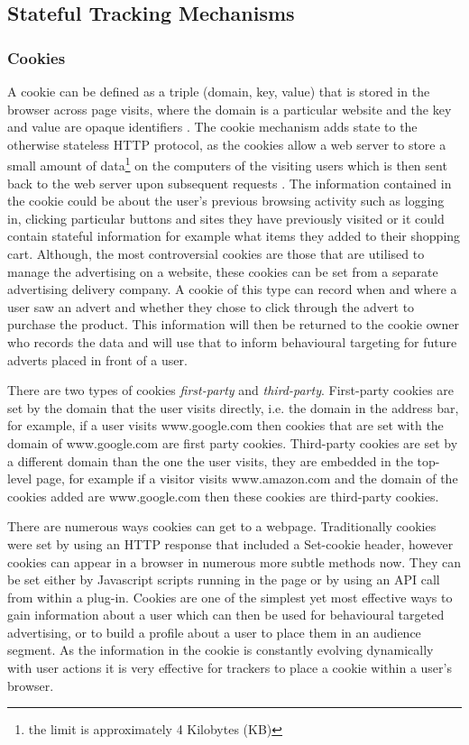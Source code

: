\documentclass[12pt]{article}
\begin{document}
\subsection{Stateful Tracking Mechanisms}

\subsubsection {Cookies} \label{cookies}
A cookie can be defined as a triple (domain, key, value) that is stored in the browser across page visits, where the domain is a particular website and the key and value are opaque identifiers \parencite{roesner}. The cookie mechanism adds state to the otherwise stateless HTTP protocol, as the cookies allow a web server to store a small amount of data\footnote{the limit is approximately 4 Kilobytes (KB)} on the computers of the visiting users which is then sent back to the web server upon subsequent requests \parencite{cookielessMonster}. The information contained in the cookie could be about the user's previous browsing activity such as logging in, clicking particular buttons and sites they have previously visited or it could contain stateful information for example what items they added to their shopping cart. Although, the most controversial cookies are those that are utilised to manage the advertising on a website, these cookies can be set from a separate advertising delivery company. A cookie of this type can record when and where a user saw an advert and whether they chose to click through the advert to purchase the product. This information will then be returned to the cookie owner who records the data and will use that to inform behavioural targeting for future adverts placed in front of a user.  \newline 

There are two types of cookies \textit{first-party} and \textit{third-party}. First-party cookies are set by the domain that the user visits directly, i.e. the domain in the address bar, for example, if a user visits www.google.com then cookies that are set with the domain of www.google.com are first party cookies. Third-party cookies are set by a different domain than the one the user visits, they are embedded in the top-level page, for example if a visitor visits www.amazon.com and the domain of the cookies added are www.google.com then these cookies are third-party cookies. \newline

There are numerous ways cookies can get to a webpage. Traditionally cookies were set by using an HTTP response that included a Set-cookie header, however cookies can appear in a browser in numerous more subtle methods now. They can be set either by Javascript scripts running in the page or by using an API call from within a plug-in. Cookies are one of the simplest yet most effective ways to gain information about a user which can then be used for behavioural targeted advertising, or to build a profile about a user to place them in an audience segment. As the information in the cookie is constantly evolving dynamically with user actions it is very effective for trackers to place a cookie within a user's browser. 
\end{document}
